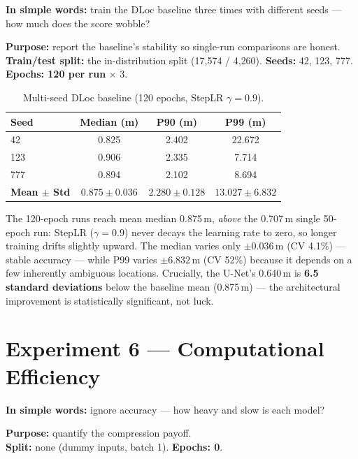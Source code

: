 \documentclass[11pt]{article}
\begin{document}
\textbf{In simple words:} train the DLoc baseline three times with different seeds --- how much does the
score wobble?

\textbf{Purpose:} report the baseline's stability so single-run comparisons are honest.\\
\textbf{Train/test split:} the in-distribution split (17{,}574 / 4{,}260). \quad \textbf{Seeds:} 42, 123,
777. \quad \textbf{Epochs: 120 per run} $\times$ 3.

\begin{table}[h]\centering\footnotesize
\caption{Multi-seed DLoc baseline (120 epochs, StepLR $\gamma=0.9$).}
\begin{tabular}{@{}lccc@{}}
\toprule
\textbf{Seed} & \textbf{Median (m)} & \textbf{P90 (m)} & \textbf{P99 (m)} \\
\midrule
42  & 0.825 & 2.402 & 22.672 \\
123 & 0.906 & 2.335 &  7.714 \\
777 & 0.894 & 2.102 &  8.694 \\
\midrule
\textbf{Mean $\pm$ Std} & $\mathbf{0.875\pm0.036}$ & $\mathbf{2.280\pm0.128}$ & $\mathbf{13.027\pm6.832}$ \\
\bottomrule
\end{tabular}
\end{table}

\begin{whybox}
The 120-epoch runs reach mean median 0.875\,m, \emph{above} the 0.707\,m single 50-epoch run: StepLR
($\gamma=0.9$) never decays the learning rate to zero, so longer training drifts slightly upward. The
median varies only $\pm0.036$\,m (CV 4.1\%) --- stable accuracy --- while P99 varies $\pm6.832$\,m (CV
52\%) because it depends on a few inherently ambiguous locations. Crucially, the U-Net's 0.640\,m is
\textbf{6.5 standard deviations} below the baseline mean (0.875\,m) --- the architectural improvement is
statistically significant, not luck.
\end{whybox}

\section{Experiment 6 --- Computational Efficiency}

\textbf{In simple words:} ignore accuracy --- how heavy and slow is each model?

\textbf{Purpose:} quantify the compression payoff.\\
\textbf{Split:} none (dummy inputs, batch 1). \quad \textbf{Epochs: 0}.
\end{document}
